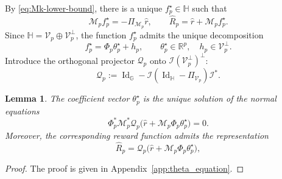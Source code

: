 \documentclass{article}
\newtheorem{lemma}[proposition]{Lemma}
\theoremstyle{definition}
\theoremstyle{remark}
\theoremstyle{plain}
\newcommand{\dsieve}{p}
\numberwithin{equation}{section}
\begin{document}
By \eqref{eq:Mk-lower-bound}, there is a unique \(f_\dsieve^\star\in\mathbb H\) such that
\begin{equation}
\label{eq:fk-projected-definition}
    \mathcal M_\dsieve f_\dsieve^\star
    =
    -\Pi_{\mathcal M_\dsieve}\widehat r,
    \qquad
    \widehat R_\dsieve
    =
    \widehat r+\mathcal M_\dsieve f_\dsieve^\star.
\end{equation}
Since \(\mathbb H=\mathcal V_\dsieve\oplus\mathcal V_\dsieve^\perp\),  the function \(f_\dsieve^\star\) admits the unique decomposition
\[
    f^\star_\dsieve=\Phi_\dsieve\theta_\dsieve^\star+h_\dsieve,
    \qquad
    \theta_\dsieve^\star\in\mathbb R^\dsieve,
    \quad
    h_\dsieve\in\mathcal V_\dsieve^\perp.
\]
Introduce the orthogonal projector \(\mathcal Q_\dsieve\) onto \(\mathcal I(\mathcal V_\dsieve^\perp)^\perp\):
\begin{equation}
\label{eq:Qk-projector}
    \mathcal Q_\dsieve
    :=
    \operatorname{Id}_{\mathbb G}
    -
    \mathcal I
    (\operatorname{Id}_{\mathbb H}-\Pi_{\mathcal V_\dsieve})
    \mathcal I^\ast.
\end{equation}
\begin{lemma}
\label{lem:theta_equation}
 The coefficient vector \(\theta_\dsieve^\star\) is the unique solution of the normal equations
\begin{equation}
\label{eq:normal-equations-operator}
    \Phi_\dsieve^\ast\mathcal M_\dsieve^\ast\mathcal Q_\dsieve
    \bigl(
        \widehat r+\mathcal M_\dsieve\Phi_\dsieve\theta_\dsieve^\star
    \bigr)
    =0.
\end{equation}
Moreover, the corresponding reward function admits the representation
\begin{equation}
\label{eq:Rk-Qk-form}
    \widehat R_\dsieve
    =
    \mathcal Q_\dsieve
    \bigl(
        \widehat r+\mathcal M_\dsieve\Phi_\dsieve\theta_\dsieve^\star
    \bigr),
\end{equation}
\end{lemma}
\begin{proof}
    The proof is given in Appendix~\ref{app:theta_equation}.
\end{proof}
\end{document}
